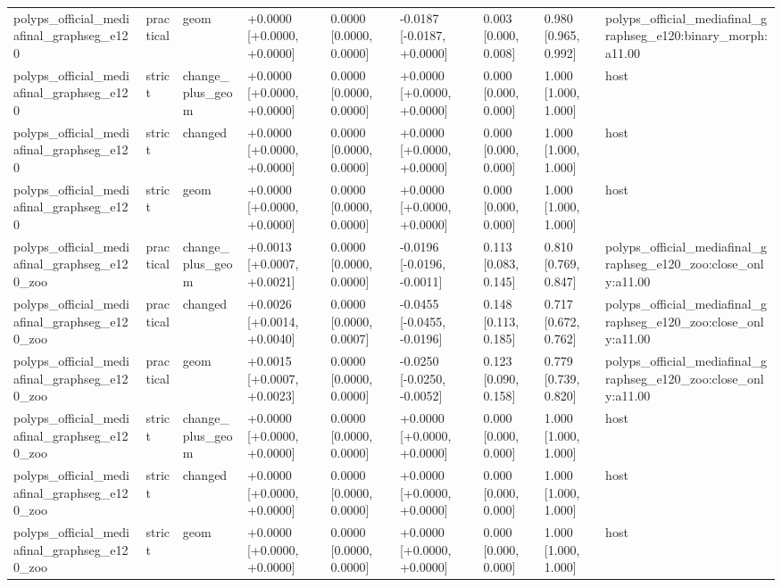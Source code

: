 \begin{table}[t]
\begin{tabular}{lllllllll}
polyps\_official\_mediafinal\_graphseg\_e120 & practical & geom & +0.0000 [+0.0000, +0.0000] & 0.0000 [0.0000, 0.0000] & -0.0187 [-0.0187, +0.0000] & 0.003 [0.000, 0.008] & 0.980 [0.965, 0.992] & polyps\_official\_mediafinal\_graphseg\_e120:binary\_morph:a11.00 \\
polyps\_official\_mediafinal\_graphseg\_e120 & strict & change\_plus\_geom & +0.0000 [+0.0000, +0.0000] & 0.0000 [0.0000, 0.0000] & +0.0000 [+0.0000, +0.0000] & 0.000 [0.000, 0.000] & 1.000 [1.000, 1.000] & host \\
polyps\_official\_mediafinal\_graphseg\_e120 & strict & changed & +0.0000 [+0.0000, +0.0000] & 0.0000 [0.0000, 0.0000] & +0.0000 [+0.0000, +0.0000] & 0.000 [0.000, 0.000] & 1.000 [1.000, 1.000] & host \\
polyps\_official\_mediafinal\_graphseg\_e120 & strict & geom & +0.0000 [+0.0000, +0.0000] & 0.0000 [0.0000, 0.0000] & +0.0000 [+0.0000, +0.0000] & 0.000 [0.000, 0.000] & 1.000 [1.000, 1.000] & host \\
polyps\_official\_mediafinal\_graphseg\_e120\_zoo & practical & change\_plus\_geom & +0.0013 [+0.0007, +0.0021] & 0.0000 [0.0000, 0.0000] & -0.0196 [-0.0196, -0.0011] & 0.113 [0.083, 0.145] & 0.810 [0.769, 0.847] & polyps\_official\_mediafinal\_graphseg\_e120\_zoo:close\_only:a11.00 \\
polyps\_official\_mediafinal\_graphseg\_e120\_zoo & practical & changed & +0.0026 [+0.0014, +0.0040] & 0.0000 [0.0000, 0.0007] & -0.0455 [-0.0455, -0.0196] & 0.148 [0.113, 0.185] & 0.717 [0.672, 0.762] & polyps\_official\_mediafinal\_graphseg\_e120\_zoo:close\_only:a11.00 \\
polyps\_official\_mediafinal\_graphseg\_e120\_zoo & practical & geom & +0.0015 [+0.0007, +0.0023] & 0.0000 [0.0000, 0.0000] & -0.0250 [-0.0250, -0.0052] & 0.123 [0.090, 0.158] & 0.779 [0.739, 0.820] & polyps\_official\_mediafinal\_graphseg\_e120\_zoo:close\_only:a11.00 \\
polyps\_official\_mediafinal\_graphseg\_e120\_zoo & strict & change\_plus\_geom & +0.0000 [+0.0000, +0.0000] & 0.0000 [0.0000, 0.0000] & +0.0000 [+0.0000, +0.0000] & 0.000 [0.000, 0.000] & 1.000 [1.000, 1.000] & host \\
polyps\_official\_mediafinal\_graphseg\_e120\_zoo & strict & changed & +0.0000 [+0.0000, +0.0000] & 0.0000 [0.0000, 0.0000] & +0.0000 [+0.0000, +0.0000] & 0.000 [0.000, 0.000] & 1.000 [1.000, 1.000] & host \\
polyps\_official\_mediafinal\_graphseg\_e120\_zoo & strict & geom & +0.0000 [+0.0000, +0.0000] & 0.0000 [0.0000, 0.0000] & +0.0000 [+0.0000, +0.0000] & 0.000 [0.000, 0.000] & 1.000 [1.000, 1.000] & host \\

\end{tabular}
\end{table}
